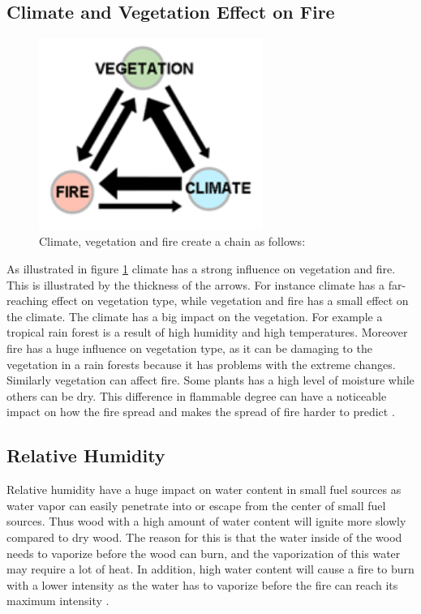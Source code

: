 \subsection{Climate and Vegetation Effect on Fire}
\begin{figure}[here]
  \centering
      \includegraphics[width=0.65\textwidth]{theory/graphics/fire-climate.png}
  \caption{Climate, vegetation and fire create a chain as follows: \cite{firetypeimage} }
  \label{fig:fire-climate}
\end{figure}
As illustrated in figure \ref{fig:fire-climate} climate has a strong influence on vegetation and fire. This is illustrated by the thickness of the arrows. For instance climate has a far-reaching effect on vegetation type, while vegetation and fire has a small effect on the climate. The climate has a big impact on the vegetation. For example a tropical rain forest is a result of high humidity and high temperatures. Moreover fire has a huge influence on vegetation type, as it can be damaging to the vegetation in a rain forests because it has problems with the extreme changes. Similarly vegetation can affect fire. Some plants has a high level of moisture while others can be dry. This difference in flammable degree can have a noticeable impact on how the fire spread and makes the spread of fire harder to predict \cite{firetypeimage}.
\subsection{Relative Humidity}
Relative humidity have a huge impact on water content in small fuel sources as water vapor can easily penetrate into or escape from the center of small fuel sources. Thus wood with a high amount of water content will ignite more slowly compared to dry wood. The reason for this is that the water inside of the wood needs to vaporize before the wood can burn, and the vaporization of this water may require a lot of heat. In addition, high water content will cause a fire to burn with a lower intensity as the water has to vaporize before the fire can reach its maximum intensity \cite{relvhum}.

